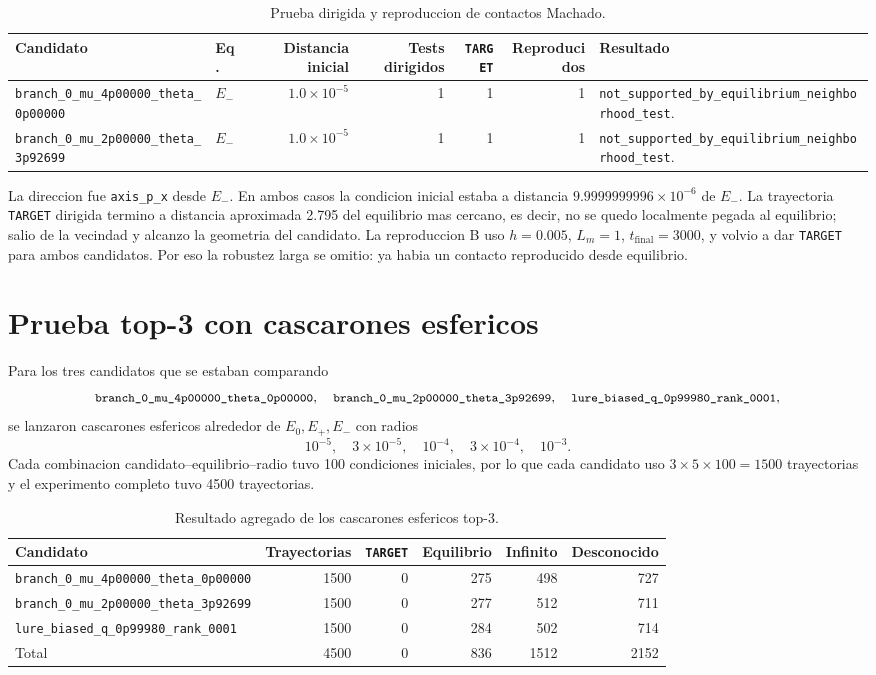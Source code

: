\documentclass[11pt]{article}
\newcommand{\status}[1]{\texttt{\small #1}}
\newcommand{\target}{\texttt{TARGET}}
\newcommand{\Ezero}{E_0}
\newcommand{\Eplus}{E_+}
\newcommand{\Eminus}{E_-}
\begin{document}
\begin{table}[h]
\centering
\caption{Prueba dirigida y reproduccion de contactos Machado.}
\small
\begin{tabularx}{\textwidth}{L{0.34\textwidth}lrrrrX}
\toprule
Candidato & Eq. & Distancia inicial & Tests dirigidos & \target{} & Reproducidos & Resultado \\
\midrule
\status{branch\_0\_mu\_4p00000\_theta\_0p00000}
& \(\Eminus\) & \(1.0\times10^{-5}\) & 1 & 1 & 1 &
\status{not\_supported\_by\_equilibrium\_neighborhood\_test}. \\
\status{branch\_0\_mu\_2p00000\_theta\_3p92699}
& \(\Eminus\) & \(1.0\times10^{-5}\) & 1 & 1 & 1 &
\status{not\_supported\_by\_equilibrium\_neighborhood\_test}. \\
\bottomrule
\end{tabularx}
\end{table}

La direccion fue \status{axis\_p\_x} desde \(\Eminus\). En ambos casos la
condicion inicial estaba a distancia \(9.9999999996\times10^{-6}\) de
\(\Eminus\). La trayectoria \target{} dirigida termino a distancia aproximada
2.795 del equilibrio mas cercano, es decir, no se quedo localmente pegada al
equilibrio; salio de la vecindad y alcanzo la geometria del candidato. La
reproduccion B uso \(h=0.005\), \(L_m=1\), \(t_{\mathrm{final}}=3000\), y
volvio a dar \target{} para ambos candidatos. Por eso la robustez larga se
omitio: ya habia un contacto reproducido desde equilibrio.

\section{Prueba top-3 con cascarones esfericos}

Para los tres candidatos que se estaban comparando
\[
\status{branch\_0\_mu\_4p00000\_theta\_0p00000},\quad
\status{branch\_0\_mu\_2p00000\_theta\_3p92699},\quad
\status{lure\_biased\_q\_0p99980\_rank\_0001},
\]
se lanzaron cascarones esfericos alrededor de \(\Ezero,\Eplus,\Eminus\) con
radios
\[
10^{-5},\quad 3\times10^{-5},\quad 10^{-4},\quad 3\times10^{-4},\quad 10^{-3}.
\]
Cada combinacion candidato--equilibrio--radio tuvo 100 condiciones iniciales,
por lo que cada candidato uso \(3\times5\times100=1500\) trayectorias y el
experimento completo tuvo 4500 trayectorias.

\begin{table}[h]
\centering
\caption{Resultado agregado de los cascarones esfericos top-3.}
\small
\begin{tabular}{lrrrrr}
\toprule
Candidato & Trayectorias & \target{} & Equilibrio & Infinito & Desconocido \\
\midrule
\status{branch\_0\_mu\_4p00000\_theta\_0p00000} & 1500 & 0 & 275 & 498 & 727 \\
\status{branch\_0\_mu\_2p00000\_theta\_3p92699} & 1500 & 0 & 277 & 512 & 711 \\
\status{lure\_biased\_q\_0p99980\_rank\_0001} & 1500 & 0 & 284 & 502 & 714 \\
\midrule
Total & 4500 & 0 & 836 & 1512 & 2152 \\
\bottomrule
\end{tabular}
\end{table}
\end{document}
